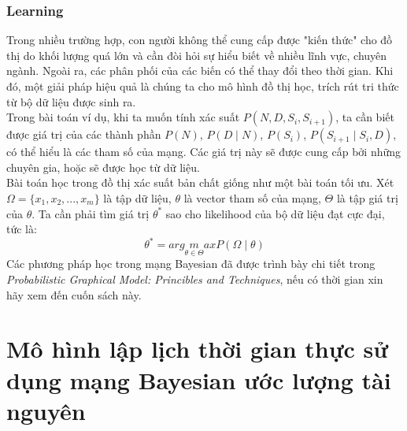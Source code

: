 \documentclass{my_style}
\begin{document}
\subsection{Learning}
Trong nhiều trường hợp, con người không thể cung cấp được "kiến thức" cho đồ thị do khối lượng quá lớn và cần đòi hỏi sự hiểu biết về nhiều lĩnh vực, chuyên ngành. Ngoài ra, các phân phối của các biến có thể thay đổi theo thời gian. Khi đó, một giải pháp hiệu quả là chúng ta cho mô hình đồ thị học, trích rút tri thức từ bộ dữ liệu được sinh ra. \\
Trong bài toán ví dụ, khi ta muốn tính xác suất $P(N, D, S_{i}, S_{i+1})$, ta cần biết được giá trị của các thành phần $P(N)$, $P(D \mid N)$, $P(S_{i})$, $P(S_{i+1} \mid S_{i}, D)$, có thể hiểu là các tham số của mạng. Các giá trị này sẽ được cung cấp bởi những chuyên gia, hoặc sẽ được học từ dữ liệu.\\
Bài toán học trong đồ thị xác suất bản chất giống như một bài toán tối ưu. Xét $\Omega = \{x_{1}, x_{2}, ..., x_{m}\}$ là tập dữ liệu, $\theta$ là vector tham số của mạng, $\Theta$ là tập giá trị của $\theta$. Ta cần phải tìm giá trị $\theta^{*}$ sao cho likelihood của bộ dữ liệu đạt cực đại, tức là: 
\begin{equation*}
	\theta^{*} = arg\underset{\theta \in \Theta}maxP(\Omega \mid \theta)
\end{equation*}
Các phương pháp học trong mạng Bayesian đã được trình bày chi tiết trong \textit{Probabilistic Graphical Model: Princibles and Techniques}\cite{28}, nếu có thời gian xin hãy xem đến cuốn sách này. 

\newpage
\chapter{Mô hình lập lịch thời gian thực sử dụng mạng Bayesian ước lượng tài nguyên}
\label{Scheduling_model}
\end{document}
